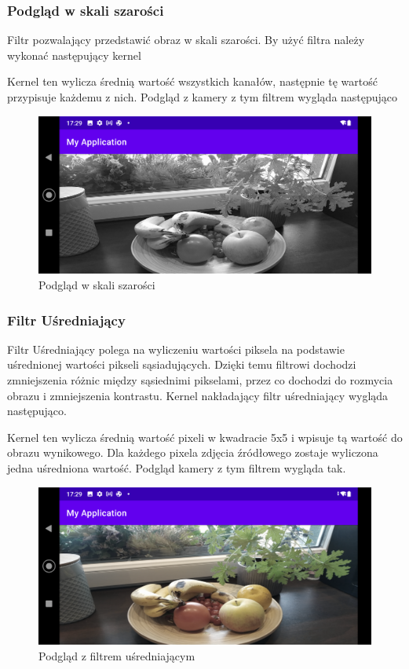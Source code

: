 \subsubsection[Podgląd w skali szarości]{Podgląd w skali szarości}
Filtr pozwalający przedstawić obraz w skali szarości. By użyć filtra należy wykonać następujący kernel

Kernel ten wylicza średnią wartość wszystkich kanałów, następnie tę wartość przypisuje każdemu z nich. Podgląd z kamery z tym filtrem wygląda następująco
\begin{figure}[H]
	\includegraphics[scale=0.16]{imgs/BlackWhite.png}
	\caption{Podgląd w skali szarości}
\end{figure}
\subsubsection[Filtr Uśredniający]{Filtr Uśredniający}
Filtr Uśredniający polega na wyliczeniu wartości piksela na podstawie uśrednionej wartości pikseli sąsiadujących. Dzięki temu filtrowi dochodzi zmniejszenia różnic między sąsiednimi pikselami, przez co dochodzi do rozmycia obrazu i zmniejszenia kontrastu. Kernel nakładający filtr uśredniający wygląda następująco.

Kernel ten wylicza średnią wartość pixeli w kwadracie 5x5 i wpisuje tą wartość do obrazu wynikowego. Dla każdego pixela zdjęcia źródłowego zostaje wyliczona jedna uśredniona wartość. Podgląd kamery z tym filtrem wygląda tak.
\begin{figure}[H]
	\includegraphics[scale=0.16]{imgs/avgFilter.png}
	\caption{Podgląd z filtrem uśredniającym}
\end{figure}
